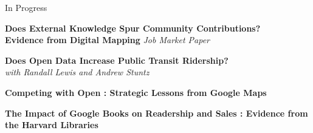 \documentclass{resume} %
\begin{document}

\begin{rSection}{In Progress}

{\bf Does External Knowledge Spur Community Contributions? \\Evidence from Digital Mapping} \emph{Job Market Paper}

{\bf Does Open Data Increase Public Transit Ridership?} \\ \emph{with Randall Lewis and Andrew Stuntz}

{\bf Competing with Open : Strategic Lessons from Google Maps} 

{\bf The Impact of Google Books on Readership and Sales : Evidence from the Harvard Libraries}

\end{rSection}

\end{document}
